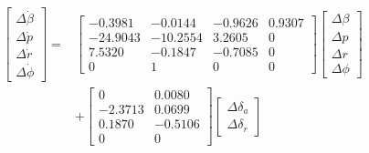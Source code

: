 %
\begin{gather}
    \begin{aligned}
    \begin{bmatrix}
    \Delta \dot{\beta} \\
    \Delta \dot{p} \\
    \Delta \dot{r} \\
    \Delta \dot{\phi}
    \end{bmatrix}  =
    &\begin{bmatrix}
    - 0.3981  & - 0.0144 & -0.9626 & 0.9307 \\
    -24.9043  & -10.2554 &  3.2605 & 0 \\
      7.5320  & - 0.1847 & -0.7085 & 0 \\
      0       &   1      &  0      & 0
    \end{bmatrix}
    \begin{bmatrix}
    \Delta \beta \\
    \Delta p \\
    \Delta r  \\
    \Delta \phi
    \end{bmatrix} \\
    & +
    \begin{bmatrix}
     0       &  0.0080 \\
    -2.3713  &  0.0699 \\
     0.1870  & -0.5106 \\
     0       &  0
    \end{bmatrix}
    \begin{bmatrix}
    \Delta \delta_a \\
    \Delta \delta_r
    \end{bmatrix}
    \label{eqn:Dynamic_model}
    \end{aligned}
\end{gather}

